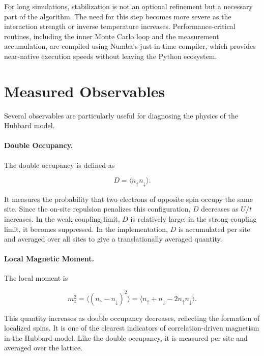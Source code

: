 \documentclass[9pt,a4paper,twocolumn,twoside]{rho-class/rho}
\begin{document}
For long simulations, stabilization is not an optional refinement but a necessary part of the algorithm. The need for this step becomes more severe as the interaction strength or inverse temperature increases. Performance-critical routines, including the inner Monte Carlo loop and the measurement accumulation, are compiled using Numba's just-in-time compiler, which provides near-native execution speeds without leaving the Python ecosystem.

\section{Measured Observables}

Several observables are particularly useful for diagnosing the physics of the Hubbard model.

\paragraph{Double Occupancy.}

The double occupancy is defined as

\begin{equation}
D = \langle n_\uparrow n_\downarrow \rangle.
\end{equation}

It measures the probability that two electrons of opposite spin occupy the same site. Since the on-site repulsion penalizes this configuration, $D$ decreases as $U/t$ increases. In the weak-coupling limit, $D$ is relatively large; in the strong-coupling limit, it becomes suppressed. In the implementation, $D$ is accumulated per site and averaged over all sites to give a translationally averaged quantity.

\paragraph{Local Magnetic Moment.}

The local moment is

\begin{equation}
m_z^2 = \langle (n_\uparrow - n_\downarrow)^2 \rangle
= \langle n_\uparrow + n_\downarrow - 2n_\uparrow n_\downarrow \rangle.
\end{equation}

This quantity increases as double occupancy decreases, reflecting the formation of localized spins. It is one of the clearest indicators of correlation-driven magnetism in the Hubbard model. Like the double occupancy, it is measured per site and averaged over the lattice.
\end{document}
